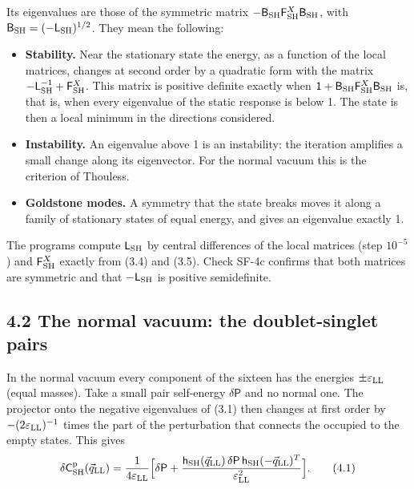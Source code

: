 \documentclass[
  10pt,
]{article}
\providecommand{\tightlist}{%
  \setlength{\itemsep}{0pt}\setlength{\parskip}{0pt}}
\begin{document}
Its eigenvalues are those of the symmetric matrix
\(-\mathsf B_{\rm SH}\mathsf F^X_{\rm SH}\mathsf B_{\rm SH}\), with
\(\mathsf B_{\rm SH}=(-\mathsf L_{\rm SH})^{1/2}\). They mean the
following:

\begin{itemize}
\tightlist
\item
  \textbf{Stability.} Near the stationary state the energy, as a
  function of the local matrices, changes at second order by a quadratic
  form with the matrix
  \(-\mathsf L_{\rm SH}^{-1}+\mathsf F^X_{\rm SH}\). This matrix is
  positive definite exactly when
  \(\mathsf 1+\mathsf B_{\rm SH}\mathsf F^X_{\rm SH}\mathsf B_{\rm SH}\)
  is, that is, when every eigenvalue of the static response is below 1.
  The state is then a local minimum in the directions considered.
\item
  \textbf{Instability.} An eigenvalue above 1 is an instability: the
  iteration amplifies a small change along its eigenvector. For the
  normal vacuum this is the criterion of Thouless.
\item
  \textbf{Goldstone modes.} A symmetry that the state breaks moves it
  along a family of stationary states of equal energy, and gives an
  eigenvalue exactly 1.
\end{itemize}

The programs compute \(\mathsf L_{\rm SH}\) by central differences of
the local matrices (step \(10^{-5}\)) and \(\mathsf F^X_{\rm SH}\)
exactly from (3.4) and (3.5). Check SF-4c confirms that both matrices
are symmetric and that \(-\mathsf L_{\rm SH}\) is positive semidefinite.

\hypertarget{the-normal-vacuum-the-doublet-singlet-pairs}{%
\subsection{4.2 The normal vacuum: the doublet-singlet
pairs}\label{the-normal-vacuum-the-doublet-singlet-pairs}}

In the normal vacuum every component of the sixteen has the energies
\(\pm\varepsilon_{\rm LL}\) (equal masses). Take a small pair
self-energy \(\delta\mathsf P\) and no normal one. The projector onto
the negative eigenvalues of (3.1) then changes at first order by
\(-(2\varepsilon_{\rm LL})^{-1}\) times the part of the perturbation
that connects the occupied to the empty states. This gives
\[\delta\mathsf C^{\rm p}_{\rm SH}(\vec q_{\rm LL})=\frac1{4\varepsilon_{\rm LL}}\Big[\delta\mathsf P+\frac{\mathsf h_{\rm SH}(\vec q_{\rm LL})\,\delta\mathsf P\,\mathsf h_{\rm SH}(-\vec q_{\rm LL})^T}{\varepsilon_{\rm LL}^2}\Big].\tag{4.1}\]
\end{document}
